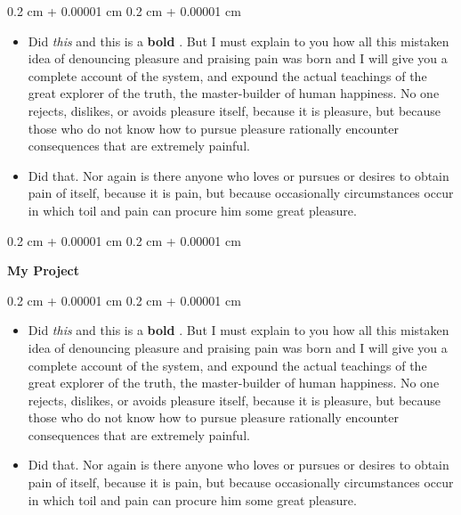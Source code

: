 \documentclass[10pt, letterpaper]{article}
\newenvironment{highlights}{
    \begin{itemize}[
        topsep=0.10 cm,
        parsep=0.10 cm,
        partopsep=0pt,
        itemsep=0pt,
        leftmargin=0.4 cm + 10pt
    ]
}{
    \end{itemize}
} %
\newenvironment{onecolentry}{
    \begin{adjustwidth}{
        0.2 cm + 0.00001 cm
    }{
        0.2 cm + 0.00001 cm
    }
}{
    \end{adjustwidth}
} %
\let\hrefWithoutArrow\href
\renewcommand{\href}[2]{\hrefWithoutArrow{#1}{\ifthenelse{\equal{#2}{}}{ }{#2 }\raisebox{.15ex}{\footnotesize \faExternalLink*}}}
\begin{document}
        \vspace{0.10 cm}
        \begin{onecolentry}
            \begin{highlights}
                \item Did \textit{this} and this is a \textbf{bold} \href{https://example.com}{link}. But I must explain to you how all this mistaken idea of denouncing pleasure and praising pain was born and I will give you a complete account of the system, and expound the actual teachings of the great explorer of the truth, the master-builder of human happiness. No one rejects, dislikes, or avoids pleasure itself, because it is pleasure, but because those who do not know how to pursue pleasure rationally encounter consequences that are extremely painful.
                \item Did that. Nor again is there anyone who loves or pursues or desires to obtain pain of itself, because it is pain, but because occasionally circumstances occur in which toil and pain can procure him some great pleasure.
            \end{highlights}
        \end{onecolentry}


        \vspace{0.2 cm}

        \begin{onecolentry}
            \textbf{My Project}
        \end{onecolentry}

        \vspace{0.10 cm}
        \begin{onecolentry}
            \begin{highlights}
                \item Did \textit{this} and this is a \textbf{bold} \href{https://example.com}{link}. But I must explain to you how all this mistaken idea of denouncing pleasure and praising pain was born and I will give you a complete account of the system, and expound the actual teachings of the great explorer of the truth, the master-builder of human happiness. No one rejects, dislikes, or avoids pleasure itself, because it is pleasure, but because those who do not know how to pursue pleasure rationally encounter consequences that are extremely painful.
                \item Did that. Nor again is there anyone who loves or pursues or desires to obtain pain of itself, because it is pain, but because occasionally circumstances occur in which toil and pain can procure him some great pleasure.
            \end{highlights}
        \end{onecolentry}
\end{document}
